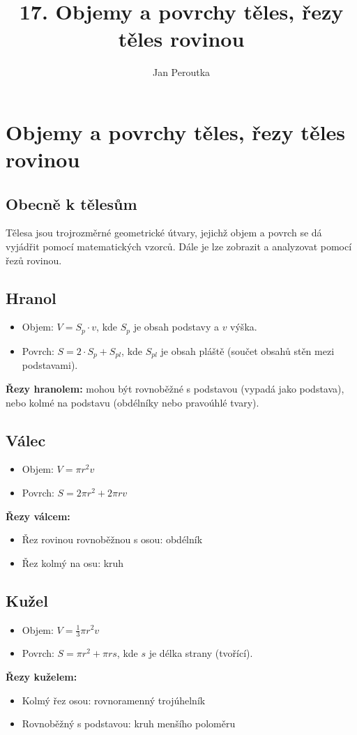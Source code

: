 \title{17. Objemy a povrchy těles, řezy těles rovinou}

\author{Jan Peroutka}
\maketitle

\section{Objemy a povrchy těles, řezy těles rovinou}

\subsection{Obecně k tělesům}
Tělesa jsou trojrozměrné geometrické útvary, jejichž objem a povrch se dá vyjádřit pomocí matematických vzorců. Dále je lze zobrazit a analyzovat pomocí řezů rovinou.

\subsection{Hranol}
\begin{itemize}
    \item Objem: $V = S_p \cdot v$, kde $S_p$ je obsah podstavy a $v$ výška.
    \item Povrch: $S = 2 \cdot S_p + S_{pl}$, kde $S_{pl}$ je obsah pláště (součet obsahů stěn mezi podstavami).
\end{itemize}
\textbf{Řezy hranolem:} mohou být rovnoběžné s podstavou (vypadá jako podstava), nebo kolmé na podstavu (obdélníky nebo pravoúhlé tvary).

\subsection{Válec}
\begin{itemize}
    \item Objem: $V = \pi r^2 v$
    \item Povrch: $S = 2\pi r^2 + 2\pi r v$
\end{itemize}
\textbf{Řezy válcem:}
\begin{itemize}
    \item Řez rovinou rovnoběžnou s osou: obdélník
    \item Řez kolmý na osu: kruh
\end{itemize}

\subsection{Kužel}
\begin{itemize}
    \item Objem: $V = \frac{1}{3} \pi r^2 v$
    \item Povrch: $S = \pi r^2 + \pi r s$, kde $s$ je délka strany (tvořící).
\end{itemize}
\textbf{Řezy kuželem:}
\begin{itemize}
    \item Kolmý řez osou: rovnoramenný trojúhelník
    \item Rovnoběžný s podstavou: kruh menšího poloměru
\end{itemize}

